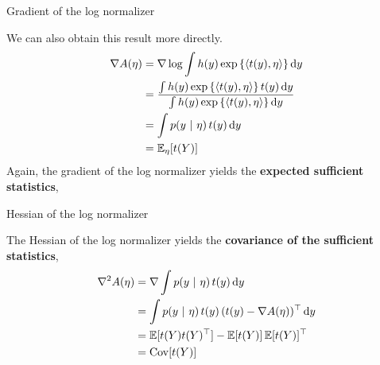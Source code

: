 \documentclass[aspectratio=169]{beamer}
\begin{document}
\begin{frame}[t,allowframebreaks]{Gradient of the log
normalizer}\label{gradient-of-the-log-normalizer}

We can also obtain this result more directly. \begin{align*}
    \nabla A(\eta) 
    &= \nabla \log \int h(y) \exp \left \{\langle t(y), \eta \rangle \right\} \mathop{}\!\mathrm{d} y \\
    &= \frac{\int h(y) \exp \left \{\langle t(y), \eta \rangle \right\} t(y) \mathop{}\!\mathrm{d} y}{\int h(y) \exp \left \{\langle t(y), \eta \rangle \right\} \mathop{}\!\mathrm{d} y} \\
    &= \int p(y ~\vert~ \eta) \, t(y) \mathop{}\!\mathrm{d} y \\
    &= \mathbb{E}_\eta[t(Y)]
\end{align*} Again, the gradient of the log normalizer yields the
\textbf{expected sufficient statistics},
\end{frame}

\begin{frame}[t,allowframebreaks]{Hessian of the log
normalizer}\label{hessian-of-the-log-normalizer}

The Hessian of the log normalizer yields the \textbf{covariance of the
sufficient statistics}, \begin{align*}
    \nabla^2 A(\eta) 
    &= \nabla \int p(y ~\vert~ \eta) \, t(y) \mathop{}\!\mathrm{d} y \\
    &= \int p(y ~\vert~ \eta) \, t(y) \, (t(y) - \nabla A(\eta))^\top \mathop{}\!\mathrm{d} y \\
    &= \mathbb{E}[t(Y) t(Y)^\top ] - \mathbb{E}[t(Y)] \, \mathbb{E}[t(Y)]^\top \\
    &= \mathrm{Cov}[t(Y)]
\end{align*}
\end{frame}
\end{document}

